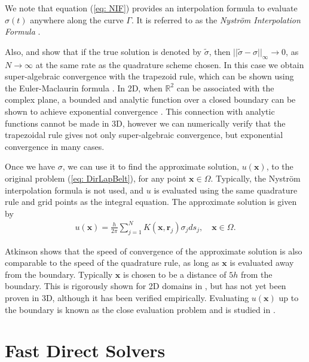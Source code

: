 \documentclass{sfuthesis}
\begin{document}
We note that equation (\ref{eq: NIF}) provides an interpolation formula to evaluate $\sigma(t)$ anywhere along the curve $\Gamma$. It is referred to as the \textit{Nystr\"{o}m Interpolation Formula} \cite{Atk97}.

Also, \cite{Atk97} and \cite{Kress99} show that if the true solution is denoted by $\widetilde{\sigma}$, then ${||\widetilde{\sigma}-{\sigma}||}_\infty \to 0$, as $N\to\infty$ at the same rate as the quadrature scheme chosen. In this case we obtain super-algebraic convergence with the trapezoid rule, which can be shown using the Euler-Maclaurin formula \cite{Greenbaum12}. In 2D, when $\mathbb{R}^2$ can be associated with the complex plane, a bounded and analytic function over a closed boundary can be shown to achieve exponential convergence \cite{Barn14}. This connection with analytic functions cannot be made in 3D, however we can numerically verify that the trapezoidal rule gives not only super-algebraic convergence, but exponential convergence in many cases.  

Once we have $\sigma$, we can use it to find the approximate solution, $u(\mathbf{x})$, to the original problem (\ref{eq: DirLapBelt}), for any point $\mathbf{x} \in \Omega$. Typically, the Nystr\"{o}m interpolation formula is not used, and $u$ is evaluated using the same quadrature rule and grid points as the integral equation. The approximate solution is given by
\begin{align}
	u(\mathbf{x})=\frac{h}{2\pi}\sum_{j=1}^N K(\mathbf{x},\mathbf{r}_j)\sigma_j ds_j, \quad \mathbf{x}\in \Omega. \label{eq: DiscreteRepFormula}
\end{align}

Atkinson \cite{Atk97} shows that the speed of convergence of the approximate solution is also comparable to the speed of the quadrature rule, as long as $\mathbf{x}$ is evaluated away from the boundary. Typically $\mathbf{x}$ is chosen to be a distance of $5h$ from the boundary. This is rigorously shown for 2D domains in \cite{Barn14}, but has not yet been proven in 3D, although it has been verified empirically. Evaluating $u(\mathbf{x})$ up to the boundary is known as the close evaluation problem and is studied in \cite{Klock13, Barn14, Hels08}. 

\chapter{Fast Direct Solvers}
\label{three}
\end{document}
